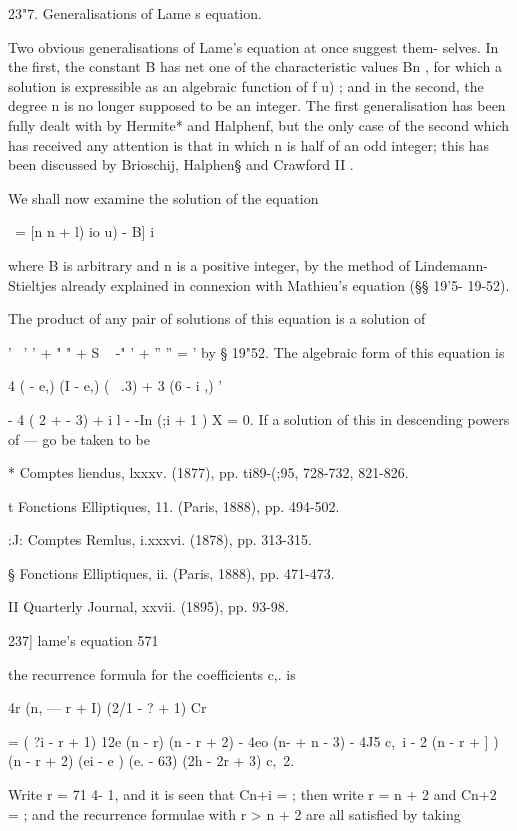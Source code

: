 {{{{{{{{23"7. Generalisations of Lame s equation.

Two obvious generalisations of Lame's equation at once suggest them-
selves. In the first, the constant B has net one of the characteristic
values Bn , for which a solution is expressible as an algebraic
function of f u) ; and in the second, the degree n is no longer
supposed to be an integer. The first generalisation has been fully
dealt with by Hermite* and Halphenf, but the only case of the second
which has received any attention is that in which n is half of an odd
integer; this has been discussed by Brioschij, Halphen§ and Crawford
II .

We shall now examine the solution of the equation

 \ = [n n + l) io u) - B] i\,

where B is arbitrary and n is a positive integer, by the method of
Lindemann- Stieltjes already explained in connexion with Mathieu's
equation (§§ 19'5- 19-52).

The product of any pair of solutions of this equation is a solution of

'~ ' ' + " " + S ~ -" ' + '' '' = ' by § 19"52. The algebraic form of
this equation is

4 ( - e,) (I - e,) ( \ .3) + 3 (6 - i ,) '

- 4 ( 2 + - 3) + i l - -In (;i + 1 ) X = 0. If a solution of this in
descending powers of — go be taken to be

* Comptes liendus, lxxxv. (1877), pp. ti89-(;95, 728-732, 821-826.

t Fonctions Elliptiques, 11. (Paris, 1888), pp. 494-502.

:J: Comptes Remlus, i.xxxvi. (1878), pp. 313-315.

§ Fonctions Elliptiques, ii. (Paris, 1888), pp. 471-473.

II Quarterly Journal, xxvii. (1895), pp. 93-98.



237] lame's equation 571

the recurrence formula for the coefficients c,. is

4r (n, — r + I) (2/1 - ? + 1) Cr

= ( ?i - r + 1) 12e (n - r) (n - r + 2) - 4eo (n- + n - 3) - 4J5 c,\ i
- 2 (n - r + ] ) (n - r + 2) (ei - e ) (e. - 63) (2h - 2r + 3) c,\ 2.

Write r = 71 4- 1, and it is seen that Cn+i = ; then write r = n + 2
and Cn+2 = ; and the recurrence formulae with r > n + 2 are all
satisfied by taking

}}}}}}}}
